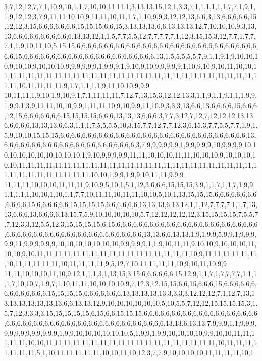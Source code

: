 3,7,12,12,7,7,1,10,9,10,1,1,7,10,10,11,11,1,3,13,13,15,12,1,3,3,7,1,1,1,1,1,1,7,7,1,9,1,1,9,12,12,3,7,9,11,11,10,10,9,11,11,10,11,1,7,1,10,9,9,3,12,12,13,6,6,3,13,6,6,6,6,6,15,12,12,3,15,6,6,6,6,6,6,6,15,15,15,6,6,15,3,13,13,13,6,6,13,13,13,12,7,10,10,10,9,3,13,13,6,6,6,6,6,6,6,6,6,6,6,13,13,12,1,1,5,7,7,5,5,12,7,7,7,7,7,1,12,3,15,15,3,12,7,7,1,7,7,7,1,1,9,10,11,10,5,15,15,6,6,6,6,6,6,6,6,6,6,6,6,6,6,6,6,6,6,6,6,6,6,6,6,6,6,6,6,6,6,6,6,6,6,6,15,6,6,6,6,6,6,6,6,6,6,6,6,6,6,6,6,6,6,6,6,6,6,6,6,13,1,5,5,5,5,5,7,9,1,1,9,1,9,10,10,10,9,10,10,9,10,10,10,9,9,9,9,9,9,1,9,9,9,1,9,10,9,10,9,9,9,9,9,1,10,9,10,9,10,11,10,10,11,11,11,11,11,11,11,11,11,11,11,11,11,11,11,11,11,11,11,11,11,11,11,11,11,11,11,11,11,11,10,11,11,11,11,9,1,7,1,1,1,1,9,11,10,10,9,9,9
10,11,11,1,9,10,1,9,10,9,1,7,1,11,11,11,7,12,7,13,15,3,12,12,13,3,1,1,9,1,1,9,1,1,1,9,9,1,9,9,1,3,9,11,11,10,10,9,9,1,11,11,10,9,10,9,9,11,10,9,3,3,3,13,6,6,13,6,6,6,6,15,6,6,6,12,15,6,6,6,6,6,6,6,15,15,15,15,6,6,6,13,13,13,6,6,6,3,7,7,3,12,7,12,7,12,12,12,13,13,6,6,6,6,6,13,13,13,6,6,3,1,1,1,7,5,5,5,5,10,3,15,7,7,12,7,7,12,3,6,15,3,7,7,5,5,7,7,1,9,1,5,9,10,10,15,15,15,6,6,6,6,6,6,6,6,6,6,6,6,6,6,6,6,6,6,6,6,6,6,6,6,6,6,6,6,6,6,6,6,6,6,13,6,6,6,6,6,6,6,6,6,6,6,6,6,6,6,6,6,6,6,6,6,6,6,6,3,7,9,9,9,9,9,9,1,9,9,9,9,9,10,9,9,9,9,10,10,10,10,10,10,10,10,10,10,1,9,10,9,9,9,9,9,11,11,10,10,10,11,11,10,10,10,9,10,10,10,10,10,11,11,11,11,11,11,11,11,11,11,11,11,11,11,11,11,11,11,11,11,11,11,11,11,11,11,11,11,11,11,11,11,11,11,11,11,10,10,1,9,9,1,9,9,10,11,11,9,9,9
11,11,11,10,10,10,11,11,11,9,10,9,5,10,1,5,1,12,3,6,6,6,15,15,15,3,9,1,1,7,1,1,7,1,9,9,1,1,1,1,1,10,10,1,10,1,1,7,7,10,11,11,10,11,11,10,10,5,10,1,13,15,15,15,6,6,6,6,6,6,6,6,6,6,6,6,15,6,6,6,6,6,6,15,15,15,15,6,6,6,6,6,6,13,13,13,6,13,12,1,1,12,7,7,7,7,1,1,7,13,13,6,6,6,13,6,6,6,6,13,15,7,5,9,10,10,10,10,10,5,7,12,12,12,12,12,3,15,15,15,15,7,5,5,7,7,12,3,3,12,5,5,12,3,15,15,15,15,6,15,6,6,6,6,6,6,6,6,6,6,6,6,6,6,6,6,6,6,6,6,6,6,6,6,6,6,6,6,6,6,6,6,6,6,6,6,6,6,6,6,6,6,6,6,6,6,6,6,6,6,6,13,13,6,6,13,13,1,9,1,9,9,5,9,9,1,9,9,9,9,9,11,9,9,9,9,9,9,10,10,10,10,10,10,10,9,9,9,9,9,1,1,9,10,11,11,9,10,10,9,10,10,10,11,10,10,9,10,11,11,11,11,11,11,11,11,11,11,11,11,11,11,11,11,11,10,9,11,11,11,11,11,11,10,11,11,11,11,11,10,11,11,11,11,9,5,12,7,10,11,11,11,11,10,9,10,11,10,9,9
11,11,10,10,10,11,10,9,12,1,1,1,3,1,13,15,3,15,6,6,6,6,6,6,15,12,9,1,1,7,1,7,7,7,7,1,1,1,1,7,10,10,7,1,9,7,1,10,11,11,10,10,10,10,9,7,12,3,12,15,15,6,6,15,6,6,6,15,6,6,6,6,6,6,6,6,6,6,6,6,6,6,15,15,15,15,6,6,6,6,6,6,6,13,13,13,13,13,3,3,3,3,12,12,12,7,1,12,7,13,13,13,13,13,13,13,13,6,6,13,13,12,9,10,10,10,10,10,10,5,10,5,5,7,12,12,15,15,15,15,3,1,5,7,12,3,3,3,3,15,15,15,15,15,6,15,6,6,15,15,15,6,6,6,6,6,6,6,6,6,6,6,6,6,6,6,6,6,6,6,6,6,6,6,6,6,6,6,6,6,6,6,6,6,6,6,6,6,6,6,6,6,6,6,6,6,6,6,6,6,6,13,13,6,13,13,7,9,9,9,1,1,9,9,9,9,9,9,9,9,9,9,9,9,9,1,9,9,10,10,10,10,10,10,5,1,9,9,1,9,9,10,10,10,10,9,9,10,10,11,11,11,11,11,10,10,11,11,11,11,11,11,11,11,11,11,11,11,11,11,11,11,11,11,11,10,11,11,11,11,11,11,11,5,1,10,11,11,11,11,11,10,10,11,10,12,3,7,7,9,10,10,10,10,11,11,11,11,10,1
